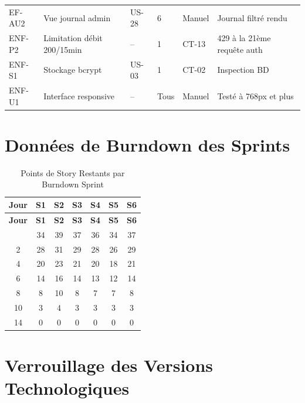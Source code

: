 \begin{center}
\begin{longtable}{p{} p{} p{} p{} p{} p{}}
EF-AU2 & Vue journal admin               & US-28    & 6 & Manuel & Journal filtré rendu \\
ENF-P2 & Limitation débit 200/15min      & --       & 1  & CT-13  & 429 à la 21ème requête auth \\
ENF-S1 & Stockage bcrypt                 & US-03    & 1  & CT-02  & Inspection BD \\
ENF-U1 & Interface responsive            & --       & Tous & Manuel & Testé à 768px et plus \\
\end{longtable}
\end{center}

\section{Données de Burndown des Sprints}

\begin{center}
\begin{longtable}{ccccccc}
\caption{Points de Story Restants par Burndown Sprint}\label{tab:burndown}\\
\toprule
\textbf{Jour} & \textbf{S1} & \textbf{S2} & \textbf{S3} & \textbf{S4} & \textbf{S5} & \textbf{S6} \\
\midrule
\endfirsthead
\toprule
\textbf{Jour} & \textbf{S1} & \textbf{S2} & \textbf{S3} & \textbf{S4} & \textbf{S5} & \textbf{S6} \\
\midrule
\endhead
\bottomrule
\endfoot
0  & 34 & 39 & 37 & 36 & 34 & 37 \\
2  & 28 & 31 & 29 & 28 & 26 & 29 \\
4  & 20 & 23 & 21 & 20 & 18 & 21 \\
6  & 14 & 16 & 14 & 13 & 12 & 14 \\
8  & 8  & 10 & 8  & 7  & 7  & 8  \\
10 & 3  & 4  & 3  & 3  & 3  & 3  \\
14 & 0  & 0  & 0  & 0  & 0  & 0  \\
\end{longtable}
\end{center}

\section{Verrouillage des Versions Technologiques}

